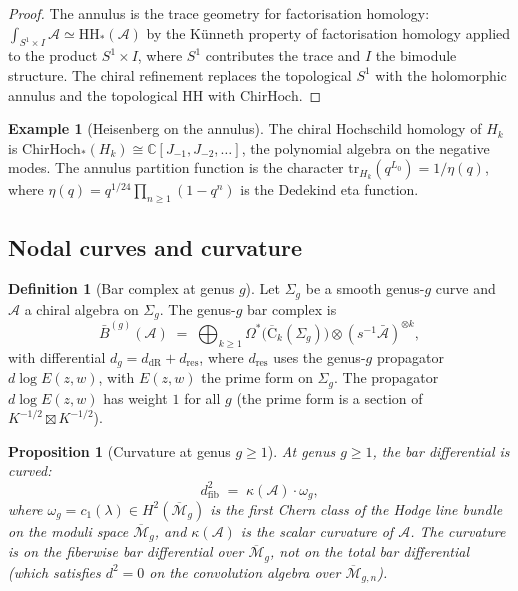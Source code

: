 \documentclass[11pt,reqno]{amsart}
\newtheorem{proposition}[theorem]{Proposition}
\theoremstyle{definition}
\newtheorem{definition}[theorem]{Definition}
\newtheorem{example}[theorem]{Example}
\theoremstyle{remark}
\providecommand{\cA}{\mathcal{A}}
\providecommand{\cM}{\mathcal{M}}
\providecommand{\FM}{\overline{\mathrm{C}}}
\providecommand{\barB}{\bar{B}}
\providecommand{\ChirHoch}{\mathrm{ChirHoch}}
\providecommand{\HH}{\mathrm{HH}}
\providecommand{\bC}{\mathbb{C}}
\begin{document}
\begin{proof}
The annulus is the trace geometry for factorisation homology:
$\int_{S^1 \times I} \cA \simeq \HH_*(\cA)$ by the
K\"unneth property of factorisation homology applied to the
product $S^1 \times I$, where $S^1$ contributes the trace
and $I$ the bimodule structure. The chiral refinement replaces
the topological $S^1$ with the holomorphic annulus and the
topological HH with $\ChirHoch$.
\end{proof}

\begin{example}[Heisenberg on the annulus]\label{ex:e-heis-annulus}
The chiral Hochschild homology of $H_k$ is
$\ChirHoch_*(H_k) \cong \bC[J_{-1}, J_{-2}, \ldots]$, the
polynomial algebra on the negative modes. The annulus partition
function is the character
$\mathrm{tr}_{H_k}(q^{L_0}) = 1/\eta(q)$, where
$\eta(q) = q^{1/24}\prod_{n \ge 1}(1 - q^n)$
is the Dedekind eta function.
\end{example}

\subsection{Nodal curves and curvature}

\begin{definition}[Bar complex at genus $g$]\label{def:e-bar-genus}
Let $\Sigma_g$ be a smooth genus-$g$ curve and $\cA$ a chiral
algebra on $\Sigma_g$. The genus-$g$ bar complex is
\begin{equation}\label{eq:e-bar-genus}
\barB^{(g)}(\cA)
\;=\;
\bigoplus_{k \ge 1}
\Omega^*\!\bigl(\FM_k(\Sigma_g)\bigr)
\otimes (s^{-1}\bar{\cA})^{\otimes k},
\end{equation}
with differential $d_g = d_{\mathrm{dR}} + d_{\mathrm{res}}$,
where $d_{\mathrm{res}}$ uses the genus-$g$ propagator
$d\log E(z,w)$, with $E(z,w)$ the prime form on $\Sigma_g$.
The propagator $d\log E(z,w)$ has weight $1$ for all $g$
\textup{(}the prime form is a section of
$K^{-1/2} \boxtimes K^{-1/2}$\textup{)}.
\end{definition}

\begin{proposition}[Curvature at genus $g \ge 1$]
\label{prop:e-curvature}
At genus $g \ge 1$, the bar differential is curved:
\begin{equation}\label{eq:e-curvature}
d_{\mathrm{fib}}^2
\;=\; \kappa(\cA) \cdot \omega_g,
\end{equation}
where $\omega_g = c_1(\lambda) \in H^2(\overline{\cM}_g)$ is
the first Chern class of the Hodge line bundle on the moduli
space $\overline{\cM}_g$, and $\kappa(\cA)$ is the scalar
curvature of $\cA$. The curvature is on the fiberwise bar
differential over $\overline{\cM}_g$, not on the total bar
differential \textup{(}which satisfies $d^2 = 0$ on the
convolution algebra over $\overline{\cM}_{g,n}$\textup{)}.
\end{proposition}
\end{document}
